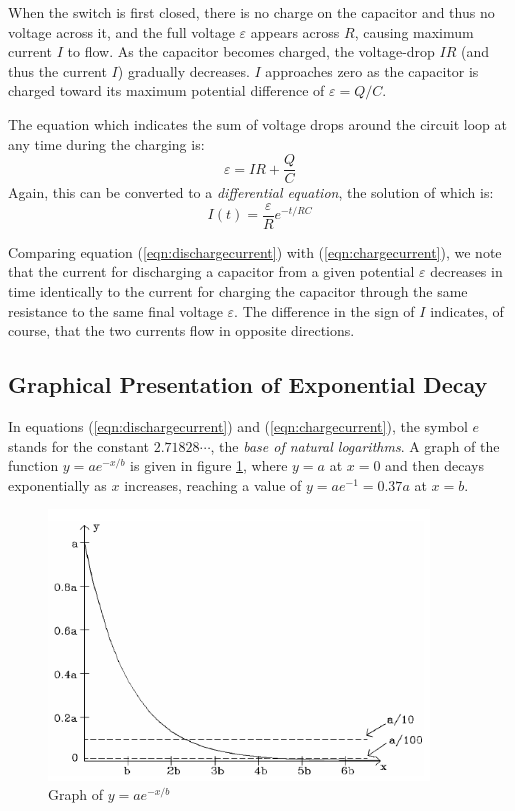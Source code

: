 When the switch is first closed, there is no charge on the capacitor and thus no voltage across it, and the full voltage $\varepsilon$ appears across $R$, causing maximum current $I$ to flow. As the capacitor becomes charged, the voltage-drop $IR$ (and thus the current $I$) gradually decreases. $I$ approaches zero as the capacitor is charged toward its maximum potential difference of $\varepsilon = Q/C$. \myskip

The equation which indicates the sum of voltage drops around the circuit loop at any time during the charging is:
\begin{equation}
    \varepsilon = IR + \frac{Q}{C}
\end{equation}
Again, this can be converted to a \emph{differential equation}, the solution of which is:
\begin{equation}
    I(t) = \frac{\varepsilon}{R}e^{-t/RC}
    \label{eqn:chargecurrent}
\end{equation}

Comparing equation (\ref{eqn:dischargecurrent}) with (\ref{eqn:chargecurrent}), we note that the current for discharging a capacitor from a given potential $\varepsilon$ decreases in time identically to the current for charging the capacitor through the same resistance to the same final voltage $\varepsilon$. The difference in the sign of $I$ indicates, of course, that the two currents flow in opposite directions.

\subsection{Graphical Presentation of Exponential Decay}

In equations (\ref{eqn:dischargecurrent}) and (\ref{eqn:chargecurrent}), the symbol $e$ stands for the constant $2.71828\cdots$, the \emph{base of natural logarithms}. A graph of the function $y = ae^{-x/b}$ is given in figure \ref{fig:expgraph}, where $y=a$ at $x=0$ and then decays exponentially as $x$ increases, reaching a value of $y = ae^{-1} = 0.37a$ at $x=b$.

\begin{figure}[h]
    \begin{center}
        \includegraphics[width=0.9\textwidth]{./Exp4/pic/image4.png}
    \end{center}
    \caption{Graph of $y=ae^{-x/b}$}
    \label{fig:expgraph}
\end{figure}

